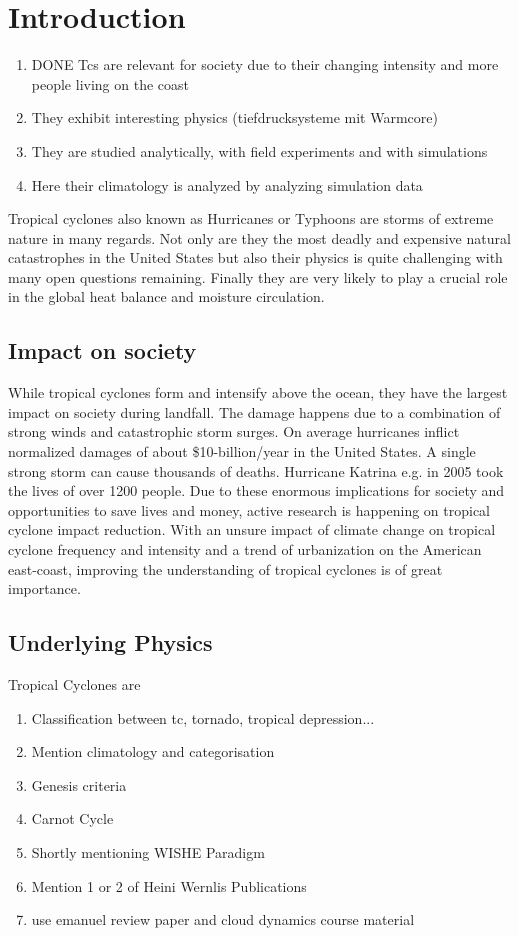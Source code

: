 \chapter{Introduction}\label{sec:introduction}
\begin{enumerate}
\item DONE Tcs are relevant for society due to their changing intensity and more people living on the coast
\item They exhibit interesting physics (tiefdrucksysteme mit Warmcore)
\item They are studied analytically, with field experiments and with simulations
\item Here their climatology is analyzed by analyzing simulation data
\end{enumerate}
Tropical cyclones also known as Hurricanes or Typhoons are storms of extreme nature in many regards. Not only are they the most deadly and expensive natural catastrophes in the United States but also their physics is quite challenging with many open questions remaining.\cite{emanuel-summ}
Finally they are very likely to play a crucial role in the global heat balance and moisture circulation.\cite{moisture-transport}\cite{global-heat}

\section{Impact on society}\label{sec:society}
While tropical cyclones form and intensify above the ocean, they have the largest impact on society during landfall. The damage happens due to a combination of strong winds and catastrophic storm surges. On average hurricanes inflict normalized damages of about \$10-billion/year in the United States.\cite{damage-norm} A single strong storm can cause thousands of deaths. Hurricane Katrina e.g. in 2005 took the lives of over 1200 people.\cite{hurr-2005}
Due to these enormous implications for society and opportunities to save lives and money, active research is happening on tropical cyclone impact reduction. With an unsure impact of climate change on tropical cyclone frequency and intensity and a trend of urbanization on the American east-coast, improving the understanding of tropical cyclones is of great importance.

\section{Underlying Physics}\label{sec:physics}
Tropical Cyclones are 
\begin{enumerate}
\item Classification between tc, tornado, tropical depression...
\item Mention climatology and categorisation
\item Genesis criteria
\item Carnot Cycle
\item Shortly mentioning WISHE Paradigm
\item Mention 1 or 2 of Heini Wernlis Publications
\item use emanuel review paper and cloud dynamics course material
\end{enumerate}


